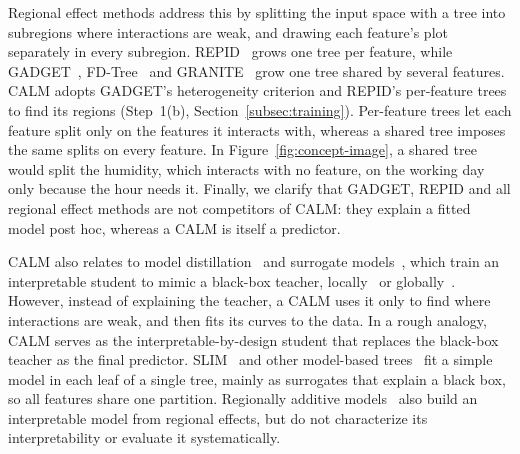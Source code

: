 Regional effect methods address this by splitting the input space with a tree into subregions where interactions are weak, and drawing each feature's plot separately in every subregion.
REPID~\cite{herbinger2022REPID} grows one tree per feature, while GADGET~\cite{herbinger2024GADGET}, FD-Tree~\cite{laberge2024fdtree} and GRANITE~\cite{herbinger2026granite} grow one tree shared by several features.
CALM adopts GADGET's heterogeneity criterion and REPID's per-feature trees to find its regions (Step~1(b), Section~\ref{subsec:training}).
Per-feature trees let each feature split only on the features it interacts with, whereas a shared tree imposes the same splits on every feature.
In Figure~\ref{fig:concept-image}, a shared tree would split the humidity, which interacts with no feature, on the working day only because the hour needs it.
Finally, we clarify that GADGET, REPID and all regional effect methods are not competitors of CALM: they explain a fitted model post hoc, whereas a CALM is itself a predictor.

CALM also relates to model distillation~\cite{hinton2015distilling, tan2018distill} and surrogate models~\cite{guidotti2018survey}, which train an interpretable student to mimic a black-box teacher, locally~\cite{ribeiro2016should} or globally~\cite{guidotti2018survey}.
However, instead of explaining the teacher, a CALM uses it only to find where interactions are weak, and then fits its curves to the data.
In a rough analogy, CALM serves as the interpretable-by-design student that replaces the black-box teacher as the final predictor.
SLIM~\cite{hu2020surrogate} and other model-based trees~\cite{herbinger2023leveraging} fit a simple model in each leaf of a single tree, mainly as surrogates that explain a black box, so all features share one partition.
Regionally additive models~\cite{gkolemis2023regionally} also build an interpretable model from regional effects, but do not characterize its interpretability or evaluate it systematically.
